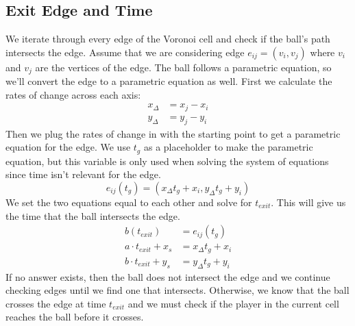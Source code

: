 \documentclass[11pt]{article}
\begin{document}
\subsection*{Exit Edge and Time}
We iterate through every edge of the Voronoi cell and check if the ball's path intersects the edge. Assume that we are considering edge
\(e_{ij} = (v_i, v_j)\) where \(v_i\) and \(v_j\) are the vertices of the edge. The ball follows a parametric equation, so we'll convert the edge to a parametric equation as well.
First we calculate the rates of change across each axis:
\begin{align*}
    x_{\Delta} &= x_j - x_i \\
    y_{\Delta} &= y_j - y_i
\end{align*}
Then we plug the rates of change in with the starting point to get a parametric equation for the edge.
We use \(t_g\) as a placeholder to make the parametric equation, but this variable is only used when solving the system of equations since time isn't relevant for the edge.
\begin{equation}
    e_{ij}(t_g) = (x_{\Delta} t_g + x_i, y_{\Delta} t_g + y_i)
\end{equation}
We set the two equations equal to each other and solve for \(t_{exit}\). This will give us the time that the ball intersects the edge.
\begin{align*}
    b(t_{exit}) &= e_{ij}(t_g) \\
    a \cdot t_{exit} + x_s &= x_{\Delta} t_g + x_i \\
    b \cdot t_{exit} + y_s &= y_{\Delta} t_g + y_i
\end{align*}
If no answer exists, then the ball does not intersect the edge and we continue checking edges until we find one that intersects. Otherwise, we know that the ball crosses the edge at time \(t_{exit}\)
and we must check if the player in the current cell reaches the ball before it crosses.
\end{document}

